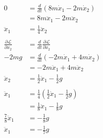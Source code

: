 \documentclass{article}
\begin{document}
\begin{align*}
  0                                         & = \frac{d}{d t} (8 m \dot{x}_1 - 2 m \dot{x}_2)                                                                                                           \\
                                            & = 8 m \ddot{x}_1 - 2 m \ddot{x}_2                                                                                                                         \\
  \ddot{x}_1                                & = \frac{1}{4} \ddot{x}_2                                                                                                                                  \\ \\
  \frac{\partial \mathcal{L}}{\partial x_2} & = \frac{d}{d t} \frac{\partial \mathcal{L}}{\partial \dot{x}_2}                                                                                           \\
  -2 m g                                    & = \frac{d}{d t} (-2 m \dot{x}_1 + 4 m \dot{x}_2)                                                                                                          \\
                                            & = -2 m \ddot{x}_1 + 4 m \ddot{x}_2                                                                                                                        \\
  \ddot{x}_2                                & = \frac{1}{2} \ddot{x}_1 - \frac{1}{2} g                                                                                                                  \\ \\
  \ddot{x}_1                                & = \frac{1}{4} \left( \frac{1}{2} \ddot{x}_1 - \frac{1}{2} g \right)                                                                                       \\
                                            & = \frac{1}{8} \ddot{x}_1 - \frac{1}{8} g                                                                                                                  \\
  \frac{7}{8} \ddot{x}_1                    & = -\frac{1}{8} g                                                                                                                                          \\
  \ddot{x}_1                                & = -\frac{1}{7} g
\end{align*}
\end{document}
